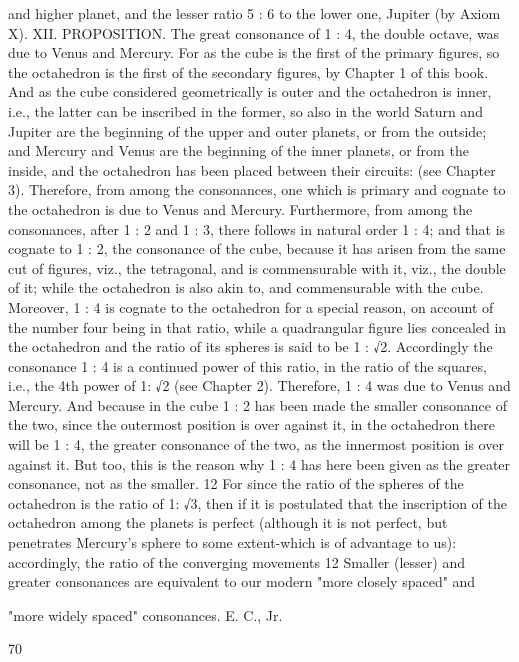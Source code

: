 \documentclass{article}
\begin{document}
and higher planet, and the lesser ratio 5 : 6 to the lower one, Jupiter (by
Axiom X).
XII. PROPOSITION. The great consonance of 1 : 4, the double octave,
was due to Venus and Mercury.
For as the cube is the first of the primary figures, so the octahedron is the
first of the secondary figures, by Chapter 1 of this book. And as the cube
considered geometrically is outer and the octahedron is inner, i.e., the
latter can be inscribed in the former, so also in the world Saturn and
Jupiter are the beginning of the upper and outer planets, or from the
outside; and Mercury and Venus are the beginning of the inner planets,
or from the inside, and the octahedron has been placed between their
circuits: (see Chapter 3). Therefore, from among the consonances, one
which is primary and cognate to the octahedron is due to Venus and
Mercury. Furthermore, from among the consonances, after 1 : 2 and 1 : 3,
there follows in natural order 1 : 4; and that is cognate to 1 : 2, the
consonance of the cube, because it has arisen from the same cut of
figures, viz., the tetragonal, and is commensurable with it, viz., the
double of it; while the octahedron is also akin to, and commensurable
with the cube. Moreover, 1 : 4 is cognate to the octahedron for a special
reason, on account of the number four being in that ratio, while a
quadrangular figure lies concealed in the octahedron and the ratio of its
spheres is said to be 1 : √2.
Accordingly the consonance 1 : 4 is a continued power of this ratio, in the
ratio of the squares, i.e., the 4th power of 1: √2 (see Chapter 2).
Therefore, 1 : 4 was due to Venus and Mercury. And because in the cube
1 : 2 has been made the smaller consonance of the two, since the
outermost position is over against it, in the octahedron there will be 1 : 4,
the greater consonance of the two, as the innermost position is over
against it. But too, this is the reason why 1 : 4 has here been given as the
greater consonance, not as the smaller. 12 For since the ratio of the
spheres of the octahedron is the ratio of 1: √3, then if it is postulated that
the inscription of the octahedron among the planets is perfect (although
it is not perfect, but penetrates Mercury's sphere to some extent-which is
of advantage to us): accordingly, the ratio of the converging movements
12 Smaller (lesser) and greater consonances are equivalent to our modern "more closely spaced" and

"more widely spaced" consonances. E. C., Jr.


70
\end{document}
